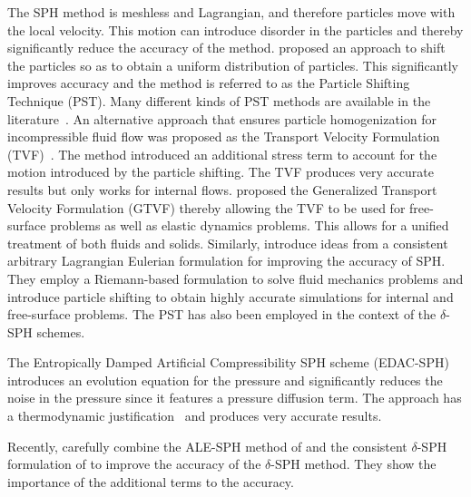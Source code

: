 


The SPH method is meshless and Lagrangian, and therefore particles move with the
local velocity. This motion can introduce disorder in the particles and thereby
significantly reduce the accuracy of the method. \cite{acc_stab_xu:jcp:2009}
proposed an approach to shift the particles so as to obtain a uniform
distribution of particles. This significantly improves accuracy and the method
is referred to as the Particle Shifting Technique (PST). Many different kinds of
PST methods are available in the
literature~\citep{diff_smoothing_sph:lind:jcp:2012,fickian_smoothing_sph:skillen:cmame:2013,huang_kernel_2019,ye2019sph}.
An alternative approach that ensures particle homogenization for incompressible
fluid flow was proposed as the Transport Velocity Formulation
(TVF)~\citep{Adami2013}. The method introduced an additional stress term to
account for the motion introduced by the particle shifting. The TVF produces
very accurate results but only works for internal flows. \cite{zhang_hu_adams17}
proposed the Generalized Transport Velocity Formulation (GTVF) thereby allowing
the TVF to be used for free-surface problems as well as elastic dynamics
problems. This allows for a unified treatment of both fluids and solids.
Similarly, \cite{oger_ale_sph_2016} introduce ideas from a consistent arbitrary
Lagrangian Eulerian formulation for improving the accuracy of SPH. They employ a
Riemann-based formulation to solve fluid mechanics problems and introduce
particle shifting to obtain highly accurate simulations for internal and
free-surface problems. The PST has also been employed in the
context of the $\delta$-SPH schemes\citep{sun_consistent_2019}.


The Entropically Damped Artificial Compressibility SPH scheme
(EDAC-SPH)~\citep{edac-sph:cf:2019} introduces an evolution equation for the
pressure and significantly reduces the noise in the pressure since it features
a pressure diffusion term. The approach has a thermodynamic
justification~\citep{Clausen2013} and produces very accurate
results.


Recently, \cite{antuono2021delta} carefully combine the ALE-SPH method of
\cite{oger_ale_sph_2016} and the consistent $\delta$-SPH formulation of
\cite{sun_consistent_2019} to improve the accuracy of the $\delta$-SPH
method. They show the importance of the additional terms to the accuracy.


